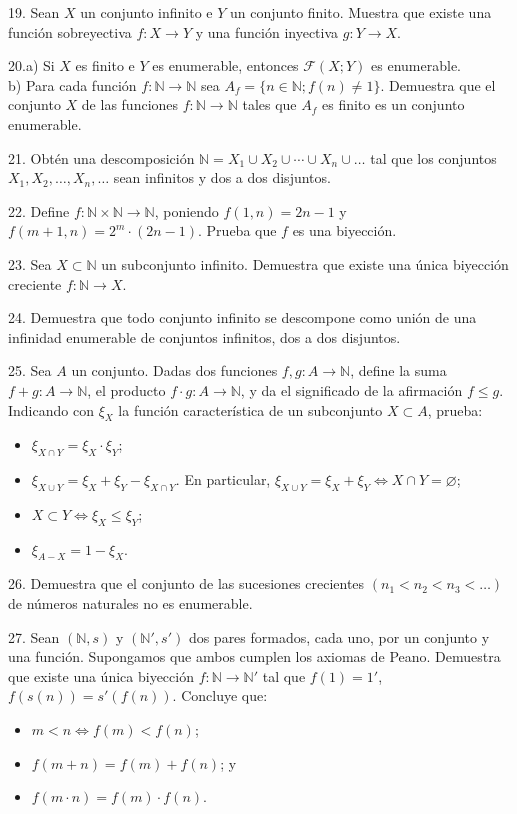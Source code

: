 19. Sean \(X\) un conjunto infinito e \(Y\) un conjunto finito. Muestra que existe una función sobreyectiva \(f: X \to Y\) y una función inyectiva \(g: Y \to X\).

20.a) Si \(X\) es finito e \(Y\) es enumerable, entonces \(\mathcal{F}(X; Y)\) es enumerable.\\
b) Para cada función \(f: \mathbb{N} \to \mathbb{N}\) sea \(A_f = \{ n \in \mathbb{N} ; f(n) \neq 1 \}\). Demuestra que el conjunto \(X\) de las funciones \(f: \mathbb{N} \to \mathbb{N}\) tales que \(A_f\) es finito es un conjunto enumerable.

21. Obtén una descomposición \( \mathbb{N} = X_1 \cup X_2 \cup \cdots \cup X_n \cup \ldots \) tal que los conjuntos \( X_1, X_2, \ldots, X_n, \ldots \) sean infinitos y dos a dos disjuntos.

22. Define \( f: \mathbb{N} \times \mathbb{N} \to \mathbb{N} \), poniendo \( f(1,n) = 2n - 1 \) y \( f(m+1,n) = 2^m \cdot (2n - 1) \). Prueba que \( f \) es una biyección.

23. Sea \( X \subset \mathbb{N} \) un subconjunto infinito. Demuestra que existe una única biyección creciente \( f: \mathbb{N} \to X \).

24. Demuestra que todo conjunto infinito se descompone como unión de una infinidad enumerable de conjuntos infinitos, dos a dos disjuntos.

25. Sea \( A \) un conjunto. Dadas dos funciones \( f, g: A \to \mathbb{N} \), define la suma \( f+g: A \to \mathbb{N} \), el producto \( f \cdot g: A \to \mathbb{N} \), y da el significado de la afirmación \( f \leq g \). Indicando con \( \xi_X \) la función característica de un subconjunto \( X \subset A \), prueba:
\begin{itemize}
    \item[a)] \( \xi_{X \cap Y} = \xi_X \cdot \xi_Y \);  
    \item[b)] \( \xi_{X \cup Y} = \xi_X + \xi_Y - \xi_{X \cap Y} \). En particular, \( \xi_{X \cup Y} = \xi_X + \xi_Y \Leftrightarrow X \cap Y = \varnothing \);
    \item[c)] \( X \subset Y \Leftrightarrow \xi_X \leq \xi_Y \);
    \item[d)] \( \xi_{A-X} = 1 - \xi_X \).
\end{itemize}

26. Demuestra que el conjunto de las sucesiones crecientes \( (n_1 < n_2 < n_3 < \ldots) \) de números naturales no es enumerable.

27. Sean \( (\mathbb{N}, s) \) y \( (\mathbb{N}', s') \) dos pares formados, cada uno, por un conjunto y una función. Supongamos que ambos cumplen los axiomas de Peano. Demuestra que existe una única biyección \( f: \mathbb{N} \to \mathbb{N}' \) tal que \( f(1) = 1' \), \( f(s(n)) = s'(f(n)) \). Concluye que:
\begin{itemize}
    \item[a)] \( m < n \Leftrightarrow f(m) < f(n) \);
    \item[b)] \( f(m+n) = f(m) + f(n) \); y
    \item[c)] \( f(m \cdot n) = f(m) \cdot f(n) \).
\end{itemize}

